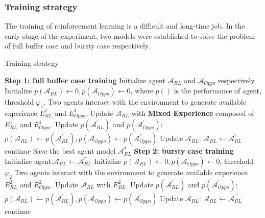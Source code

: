 \documentclass[conference,compsocconf]{IEEEtran}
\begin{document}
\subsubsection{Training strategy}
The training of reinforcement learning is a difficult and long-time job.
In the early stage of the experiment, two models were established to solve the problem of full buffer case and bursty case respectively.

\begin{algorithm}
	\caption{Training strategy}
	\begin{algorithmic}[1]
		\STATE \textbf{Step 1: full buffer case training}
		\STATE
		Initialize agent $\mathcal{A}_{RL}$ and $\mathcal{A}_{Oppo}$ respectively.
		\STATE  
		Initialize $p(\mathcal{A}_{RL}) \leftarrow 0, p(\mathcal{A}_{Oppo}) \leftarrow 0$, where $ p() $ is the performance of agent, threshold $ \varphi_{1} $.
		\STATE Two agents interact with the environment to generate available experience $ E_{RL}^1$ and $E_{Oppo}^1$.
		\STATE Update $ \mathcal{A}_{RL} $ with \textbf{Mixed Experience} composed of $ E_{RL}^1$ and $E_{Oppo}^1$.
		\ENDFOR
		\STATE Update $p(\mathcal{A}^{\prime}_{RL})$ and $p(\mathcal{A}^{\prime}_{Oppo})$:
		$
		p(\mathcal{A}_{RL}) \leftarrow p(\mathcal{A}^{\prime}_{RL}), p(\mathcal{A}_{Oppo}) \leftarrow p(\mathcal{A}^{\prime}_{Oppo})
		$
		\STATE Update $\mathcal{A}_{RL}$: $ \mathcal{A}_{RL} \leftarrow \mathcal{A}^{\prime}_{RL} $
		\ELSE
		\STATE continue
		\ENDIF
		\ENDWHILE
		\STATE Save the best agent model $ \mathcal{A}^{*}_{RL} $
		\STATE \textbf{Step 2: bursty case training}
		\STATE
		Initialize agent:$\mathcal{A}_{RL} \leftarrow \mathcal{A}^{*}_{RL}$
		\STATE
		Initialize $p(\mathcal{A}_{RL}) \leftarrow 0, p(\mathcal{A}_{Oppo}) \leftarrow 0$, threshold $ \varphi_{2} $
		\STATE Two agents interact with the environment to generate available experience $ E_{RL}^2$ and $E_{Oppo}^2$.
		\STATE Update $ \mathcal{A}_{RL} $ with $ E_{RL}^2$.
		\STATE Update $p(\mathcal{A}^{\prime}_{RL})$ and $p(\mathcal{A}^{\prime}_{Oppo})$:
		$
		p(\mathcal{A}_{RL}) \leftarrow p(\mathcal{A}^{\prime}_{RL}), p(\mathcal{A}_{Oppo}) \leftarrow p(\mathcal{A}^{\prime}_{Oppo})
		$
		\ENDFOR
		\STATE Update $\mathcal{A}_{RL}$: $ \mathcal{A}_{RL} \leftarrow \mathcal{A}^{\prime}_{RL} $
		\ELSE
		\STATE continue
		\ENDIF
		\ENDWHILE
	\end{algorithmic}
\end{algorithm}
\end{document}
